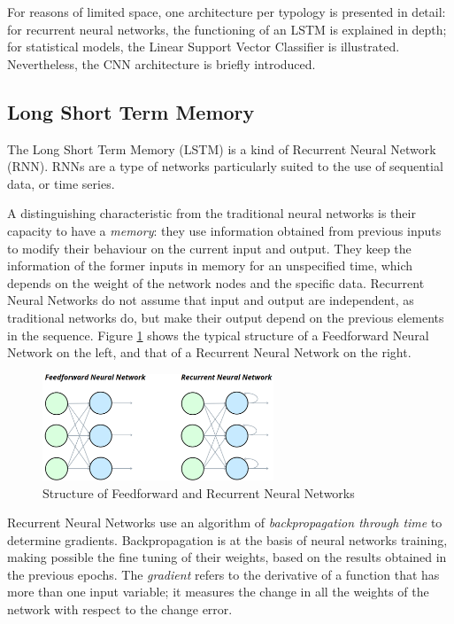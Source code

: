 \documentclass[letterpaper,11pt]{article}
\begin{document}
For reasons of limited space, one architecture per typology is presented in detail: for recurrent neural networks, the functioning of an LSTM is explained in depth; for statistical models, the Linear Support Vector Classifier is illustrated. Nevertheless, the CNN architecture is briefly introduced.

\subsection{Long Short Term Memory}

The Long Short Term Memory (LSTM) is a kind of Recurrent Neural Network (RNN). RNNs are a type of networks particularly suited to the use of sequential data, or time series. 

A distinguishing characteristic from the traditional neural networks is their capacity to have a \textit{memory}: they use information obtained from previous inputs to modify their behaviour on the current input and output. They keep the information of the former inputs in memory for an unspecified time, which depends on the weight of the network nodes and the specific data. Recurrent Neural Networks do not assume that input and output are independent, as traditional networks do, but make their output depend on the previous elements in the sequence. Figure \ref{figure:fnn_vs_rnn} shows the typical structure of a Feedforward Neural Network on the left, and that of a Recurrent Neural Network on the right.

\vspace{0.25cm}
\begin{figure}[H]
  \centering
  \includegraphics[width=6.9cm]{feedforward_vs_recurrent_nn.png}
  \caption{Structure of Feedforward and Recurrent Neural Networks}
  \label{figure:fnn_vs_rnn}
\end{figure}

Recurrent Neural Networks use an algorithm of \textit{backpropagation through time} to determine gradients. Backpropagation is at the basis of neural networks training, making possible the fine tuning of their weights, based on the results obtained in the previous epochs. The \textit{gradient} refers to the derivative of a function that has more than one input variable; it measures the change in all the weights of the network with respect to the change error. 
\end{document}
